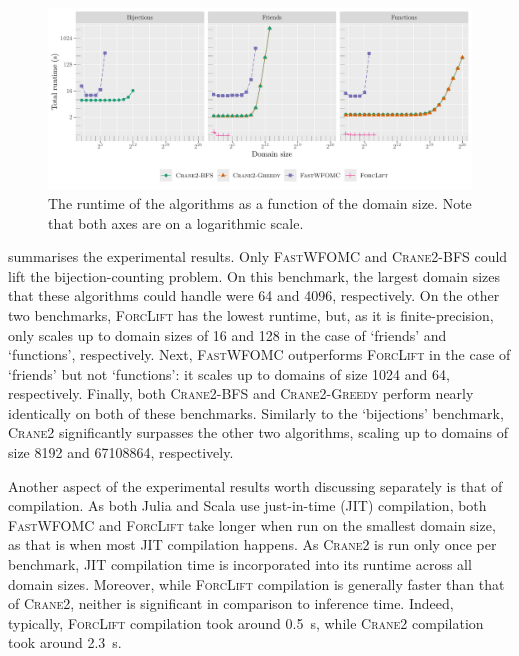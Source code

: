 \documentclass[letterpaper]{article} %
\theoremstyle{remark}
\theoremstyle{definition}
\newcommand{\Cranetwo}{\textsc{Crane2}}
\newcommand{\Cranebfs}{\textsc{Crane2-BFS}}
\newcommand{\Cranegreedy}{\textsc{Crane2-Greedy}}
\begin{document}

\begin{figure}[t]
  \centering
  \includegraphics{plot.pdf}
  \caption{The runtime of the algorithms as a function of the domain size. Note
    that both axes are on a logarithmic scale.}\label{fig:plot}
\end{figure}

 summarises the experimental results. Only \textsc{FastWFOMC} and
\Cranebfs{} could lift the bijection-counting problem. On this benchmark, the
largest domain sizes that these algorithms could handle were \num{64} and
\num{4096}, respectively. On the other two benchmarks, \textsc{ForcLift} has the
lowest runtime, but, as it is finite-precision, only scales up to domain sizes
of \num{16} and \num{128} in the case of `friends' and `functions',
respectively. Next, \textsc{FastWFOMC} outperforms \textsc{ForcLift} in the case
of `friends' but not `functions': it scales up to domains of size \num{1024} and
\num{64}, respectively. Finally, both \Cranebfs{} and \Cranegreedy{} perform
nearly identically on both of these benchmarks. Similarly to the `bijections'
benchmark, \Cranetwo{} significantly surpasses the other two algorithms, scaling
up to domains of size \num{8192} and \num{67108864}, respectively.

Another aspect of the experimental results worth discussing separately is that
of compilation. As both Julia and Scala use just-in-time (JIT) compilation, both
\textsc{FastWFOMC} and \textsc{ForcLift} take longer when run on the smallest
domain size, as that is when most JIT compilation happens. As \Cranetwo{} is run
only once per benchmark, JIT compilation time is incorporated into its runtime
across all domain sizes. Moreover, while \textsc{ForcLift} compilation is
generally faster than that of \Cranetwo{}, neither is significant in comparison
to inference time. Indeed, typically, \textsc{ForcLift} compilation took around
\SI{0.5}{\second}, while \Cranetwo{} compilation took around \SI{2.3}{\second}.
\end{document}
